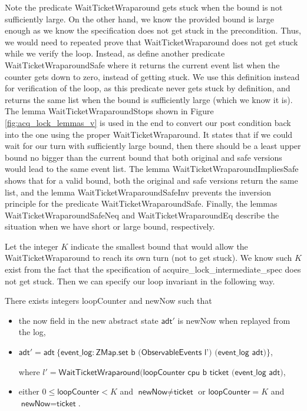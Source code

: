 Note the predicate \textsf{WaitTicketWraparound} gets stuck when the bound is not sufficiently large.
On the other hand, we know the provided bound is large enough as we know the specification does
not get stuck in the precondition. Thus, we would need to repeated prove that \textsf{WaitTicketWraparound}
does not get stuck while we verify the loop. Instead, as define another predicate
\textsf{WaitTicketWraparoundSafe} where it returns the current event list when the counter gets down
to zero, instead of getting stuck. We use this definition instead for verification of the loop, as this
predicate never gets stuck by definition, and returns the same list when the bound is sufficiently large (which
we know it is). The lemma \textsf{WaitTicketWraparoundStops} shown in Figure \ref{fig:acq_lock_lemmas_v}
is used in the end to convert our post condition back into the one using the proper \textsf{WaitTicketWraparound}.
It states that if we could wait for our turn with sufficiently large bound, then there should be a least
upper bound no bigger than the current bound that both original and safe versions would lead to the same event list.
The lemma \textsf{WaitTicketWraparoundImpliesSafe} shows that for a valid bound, both the original
and safe versions return the same list, and the lemma \textsf{WaitTicketWraparoundSafeInv}
prevents the inversion principle for the predicate \textsf{WaitTicketWraparoundSafe}.
Finally, the lemmas \textsf{WaitTicketWraparoundSafeNeq} and \textsf{WaitTicketWraparoundEq}
describe the situation when we have short or large bound, respectively.

Let the integer $K$ indicate the smallest bound that would allow the \textsf{WaitTicketWraparound}
to reach its own turn (not to get stuck). We know such $K$ exist from the fact that the specification
of \textsf{acquire\_lock\_intermediate\_spec} does not get stuck. Then we can specify
our loop invariant in the following way. 

\begin{definition}
There exists integers \textsf{loopCounter} and \textsf{newNow} such that
\begin{itemize}
\item the \textsf{now} field in the new abstract state $\textsf{adt}'$ is \textsf{newNow} when replayed from the log,
\item $\textsf{adt}' = \textsf{adt}~\{\textsf{event\_log}: \textsf{ZMap.set b (ObservableEvents l') (event\_log adt)}\}$,


where $l' = \textsf{WaitTicketWraparound}(\textsf{loopCounter cpu b ticket (event\_log adt)}$,
\item either $0\le \textsf{loopCounter}<K$ and $\textsf{newNow}\neq\textsf{ticket}$ or
$\textsf{loopCounter}=K$ and $\textsf{newNow}=\textsf{ticket}$.
\end{itemize}
\end{definition}

